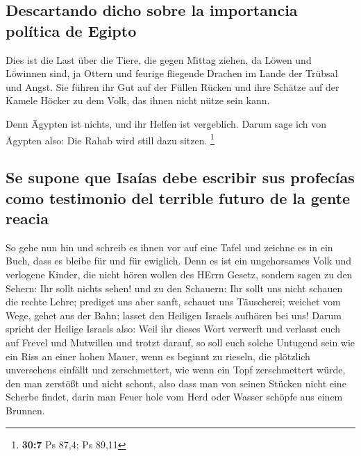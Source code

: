 \hypertarget{descartando-dicho-sobre-la-importancia-poluxedtica-de-egipto}{%
\subsection{Descartando dicho sobre la importancia política de
Egipto}\label{descartando-dicho-sobre-la-importancia-poluxedtica-de-egipto}}

 Dies ist die Last über die Tiere, die gegen Mittag
ziehen, da Löwen und Löwinnen sind, ja Ottern und feurige fliegende
Drachen im Lande der Trübsal und Angst. Sie führen ihr Gut auf der
Füllen Rücken und ihre Schätze auf der Kamele Höcker zu dem Volk, das
ihnen nicht nütze sein kann.

 Denn Ägypten ist nichts, und ihr Helfen ist vergeblich.
Darum sage ich von Ägypten also: Die Rahab wird still dazu sitzen.
\footnote{\textbf{30:7} Ps 87,4; Ps 89,11}

\hypertarget{se-supone-que-isauxedas-debe-escribir-sus-profecuxedas-como-testimonio-del-terrible-futuro-de-la-gente-reacia}{%
\subsection{Se supone que Isaías debe escribir sus profecías como
testimonio del terrible futuro de la gente
reacia}\label{se-supone-que-isauxedas-debe-escribir-sus-profecuxedas-como-testimonio-del-terrible-futuro-de-la-gente-reacia}}

 So gehe nun hin und schreib es ihnen vor auf eine Tafel
und zeichne es in ein Buch, dass es bleibe für und für ewiglich.
 Denn es ist ein ungehorsames Volk und verlogene Kinder,
die nicht hören wollen des HErrn Gesetz,  sondern sagen
zu den Sehern: Ihr sollt nichts sehen! und zu den Schauern: Ihr sollt
uns nicht schauen die rechte Lehre; prediget uns aber sanft, schauet uns
Täuscherei;  weichet vom Wege, gehet aus der Bahn; lasset
den Heiligen Israels aufhören bei uns!  Darum spricht der
Heilige Israels also: Weil ihr dieses Wort verwerft und verlasst euch
auf Frevel und Mutwillen und trotzt darauf,  so soll euch
solche Untugend sein wie ein Riss an einer hohen Mauer, wenn es beginnt
zu rieseln, die plötzlich unversehens einfällt und zerschmettert,
 wie wenn ein Topf zerschmettert würde, den man zerstößt
und nicht schont, also dass man von seinen Stücken nicht eine Scherbe
findet, darin man Feuer hole vom Herd oder Wasser schöpfe aus einem
Brunnen.

